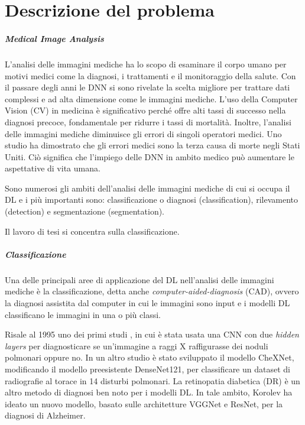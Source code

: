 \chapter{Descrizione del problema}
\label{chap:3}
    
    \paragraph{Medical Image Analysis}
    L'analisi delle immagini mediche ha lo scopo di esaminare il corpo umano per motivi medici come la diagnosi, i trattamenti e il monitoraggio della salute. Con il passare degli anni le DNN si sono rivelate la scelta migliore per trattare dati complessi e ad alta dimensione come le immagini mediche. L'uso della Computer Vision (CV) in medicina è significativo perché offre alti tassi di successo nella diagnosi precoce, fondamentale per ridurre i tassi di mortalità. Inoltre, l'analisi delle immagini mediche diminuisce gli errori di singoli operatori medici. Uno studio %
    \cite{makary2016medical} ha dimostrato che gli errori medici sono la terza causa di morte negli Stati Uniti. Ciò significa che l'impiego delle DNN in ambito medico può aumentare le aspettative di vita umana.
    
    Sono numerosi gli ambiti dell'analisi delle immagini mediche di cui si occupa il DL e i più importanti sono: classificazione o diagnosi (classification), rilevamento (detection) e segmentazione (segmentation).
    
    Il lavoro di tesi si concentra sulla classificazione.
    
    \paragraph{Classificazione}
    Una delle principali aree di applicazione del DL nell'analisi delle immagini mediche è la classificazione, detta anche \textit{computer-aided-diagnosis} (CAD), ovvero la diagnosi assistita dal computer in cui le immagini sono input e i modelli DL classificano le immagini in una o più classi.
    
    Risale al 1995 uno dei primi studi %
    \cite{lo1995artificial}, in cui è stata usata una CNN con due \textit{hidden layers} per diagnosticare se un'immagine a raggi X raffigurasse dei noduli polmonari oppure no.
    In un altro studio %
    \cite{rajpurkar2017chexnet} è stato sviluppato il modello CheXNet, modificando il modello preesistente DenseNet121, per classificare un dataset di radiografie al torace in 14 disturbi polmonari. 
    La retinopatia diabetica (DR) è un altro metodo di diagnosi ben noto per i modelli DL. In tale ambito, Korolev %
    \cite{korolev2017residual} ha ideato un nuovo modello, basato sulle architetture VGGNet e ResNet, per la diagnosi di Alzheimer.
    
